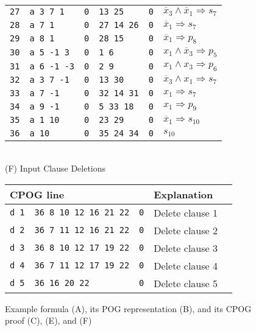 \documentclass[twoside,11pt]{article}
\newcommand{\obar}[1]{\overline{#1}}
\newcommand{\imply}{\Rightarrow}
\begin{document}
\begin{figure}
\begin{minipage}{0.49\textwidth}
\begin{tabular}{llllll}
\texttt{27} & \texttt{a 3 7 1} & \texttt{0} & \texttt{13 25} & \texttt{0} & $\obar{x}_3 \land \obar{x}_1 \imply s_7$  \\
\texttt{28} & \texttt{a 7 1} & \texttt{0} & \texttt{27 14 26} & \texttt{0} & $\obar{x}_1 \imply s_7$  \\
\texttt{29} & \texttt{a 8 1} & \texttt{0} & \texttt{28 15} & \texttt{0} & $\obar{x}_1 \imply p_8$  \\
\texttt{30} & \texttt{a 5 -1 3} & \texttt{0} & \texttt{1 6} & \texttt{0} & $x_1 \land \obar{x}_3 \imply p_5$ \\
\texttt{31} & \texttt{a 6 -1 -3} & \texttt{0} & \texttt{2 9} & \texttt{0} & $x_1 \land x_3 \imply p_6$ \\
\texttt{32} & \texttt{a 3 7 -1} & \texttt{0} & \texttt{13 30} & \texttt{0} & $\obar{x}_3 \land x_1 \imply s_7$  \\
\texttt{33} & \texttt{a 7 -1} & \texttt{0} & \texttt{32 14 31} & \texttt{0} & $x_1 \imply s_7$  \\
\texttt{34} & \texttt{a 9 -1} & \texttt{0} & \texttt{5 33 18} & \texttt{0} & $x_1 \imply p_9$  \\
\texttt{35} & \texttt{a 1 10} & \texttt{0} & \texttt{23 29} & \texttt{0} & $\obar{x}_1 \imply s_{10}$  \\
\texttt{36} & \texttt{a 10} & \texttt{0} & \texttt{35 24 34} & \texttt{0} & $s_{10}$ \\
\bottomrule
\end{tabular}
\\[1.5ex]
(F) Input Clause Deletions\\[1.2ex]
\begin{tabular}{lllll}
  \toprule
 \multicolumn{3}{l}{CPOG line} & Explanation\\
\midrule
 \texttt{d 1} & \texttt{36 8 10 12 16 21 22} & \texttt{0} & Delete clause 1 \\
 \texttt{d 2} & \texttt{36 7 11 12 16 21 22} & \texttt{0} & Delete clause 2 \\
 \texttt{d 3} & \texttt{36 8 10 12 17 19 22} & \texttt{0} & Delete clause 3 \\
 \texttt{d 4} & \texttt{36 7 11 12 17 19 22} & \texttt{0} & Delete clause 4 \\
 \texttt{d 5} & \texttt{36 16 20 22} & \texttt{0} &  Delete clause 5 \\
\bottomrule
\end{tabular}
\end{minipage}
\caption{Example formula (A), its POG representation (B), and its CPOG proof (C), (E), and (F)}
\label{fig:eg4:all}
\end{figure}
\end{document}
